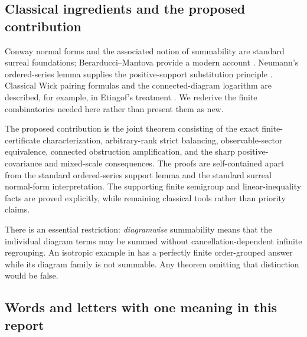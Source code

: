 \documentclass[11pt,letterpaper]{article}
\numberwithin{equation}{section}
\theoremstyle{definition}
\theoremstyle{remark}
\begin{document}
\subsection{Classical ingredients and the proposed contribution}

Conway normal forms and the associated notion of summability are standard
surreal foundations; Berarducci--Mantova provide a modern account
\cite[Sections 2.3--2.6]{BM}. Neumann's ordered-series lemma supplies the
positive-support substitution principle \cite{Neumann}. Classical Wick
pairing formulas and the connected-diagram logarithm are described, for
example, in Etingof's treatment \cite[Chapter 3]{Etingof}. We rederive the
finite combinatorics needed here rather than present them as new.

The proposed contribution is the joint theorem consisting of the exact
finite-certificate characterization, arbitrary-rank strict balancing,
observable-sector equivalence, connected obstruction amplification, and the
sharp positive-covariance and mixed-scale consequences. The proofs are
self-contained apart from the standard ordered-series support lemma and the
standard surreal normal-form interpretation. The supporting finite
semigroup and linear-inequality facts are proved explicitly, while remaining
classical tools rather than priority claims.

There is an essential restriction: \emph{diagramwise} summability means that
the individual diagram terms may be summed without cancellation-dependent
infinite regrouping. An isotropic example in  has a
perfectly finite order-grouped answer while its diagram family is not
summable. Any theorem omitting that distinction would be false.

\subsection{Words and letters with one meaning in this report}
\label{wick:sub:conventions}
\end{document}

